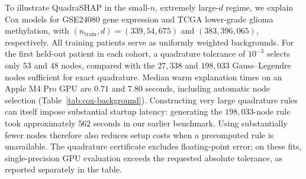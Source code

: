 To illustrate QuadraSHAP in the small-$n$, extremely large-$d$ regime, we explain Cox models for GSE24080 gene expression and TCGA lower-grade glioma methylation, with $(n_{\mathrm{train}},d)=(339,54{,}675)$ and $(383,396{,}065)$, respectively. All training patients serve as uniformly weighted backgrounds. For the first held-out patient in each cohort, a quadrature tolerance of $10^{-3}$ selects only $53$ and $48$ nodes, compared with the $27{,}338$ and $198{,}033$ Gauss--Legendre nodes sufficient for exact quadrature. Median warm explanation times on an Apple M4 Pro GPU are $0.71$ and $7.80$ seconds, including automatic node selection (Table~\ref{tab:cox-background}). Constructing very large quadrature rules can itself impose substantial startup latency: generating the $198{,}033$-node rule took approximately $562$ seconds in our earlier benchmark. Using substantially fewer nodes therefore also reduces setup costs when a precomputed rule is unavailable. The quadrature certificate excludes floating-point error; on these fits, single-precision GPU evaluation exceeds the requested absolute tolerance, as reported separately in the table.
